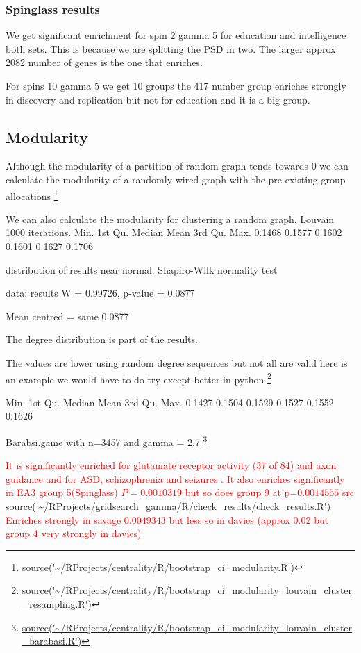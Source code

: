 \subsubsection{Spinglass results}
We get significant enrichment for spin 2 gamma 5 for education and intelligence both sets. This is because we are splitting the PSD in two. The larger approx 2082 number of genes is the one that enriches.

For spins 10 gamma 5 we get 10 groups the 417 number group enriches strongly in discovery and replication but not for education and it is a big group.



\subsection{Modularity}

Although the modularity of a partition of random graph tends towards 0 we can calculate the modularity of a randomly wired graph with the pre-existing group allocations \footnote{\url{source('~/RProjects/centrality/R/bootstrap_ci_modularity.R')}}

We can also calculate the modularity for clustering a random graph. Louvain 1000 iterations.
  Min. 1st Qu.  Median    Mean 3rd Qu.    Max. 
 0.1468  0.1577  0.1602  0.1601  0.1627  0.1706 
 
 distribution of results near normal. 	Shapiro-Wilk normality test

data:  results
W = 0.99726, p-value = 0.0877

Mean centred = same 0.0877

The degree distribution is part of the results. 

The values are lower using random degree sequences but not all are valid here is an example we would have to do try except better in python \footnote{\url{source('~/RProjects/centrality/R/bootstrap_ci_modularity_louvain_cluster_resampling.R')}}

   Min. 1st Qu.  Median    Mean 3rd Qu.    Max. 
 0.1427  0.1504  0.1529  0.1527  0.1552  0.1626 
 
 Barabsi.game with n=3457 and gamma = 2.7
 \footnote{\url{source('~/RProjects/centrality/R/bootstrap_ci_modularity_louvain_cluster_barabasi.R')}}
 

\textcolor{red}{It is significantly enriched for glutamate receptor activity (37 of 84) and axon guidance and for ASD, schizophrenia and seizures . It also enriches significantly in EA3 group 5(Spinglass) $P=0.0010319$ but so does group 9 at p=$0.0014555$ src \url{source('~/RProjects/gridsearch_gamma/R/check_results/check_results.R')}
Enriches strongly in savage $0.0049343$ but less so in davies (approx 0.02 but group 4 very strongly in davies)}

